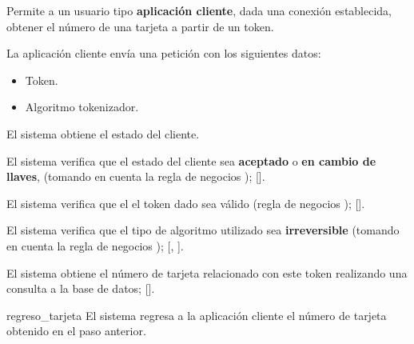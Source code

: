 %
%

{
  Permite a un usuario tipo \textbf{aplicación cliente}, dada una conexión
  establecida, obtener el número de una tarjeta a partir de un token.

  \begin{trayectoriaPrincipal}

    \item La aplicación cliente envía una petición con los siguientes datos:
      \begin{itemize}
        \item Token.
        \item Algoritmo tokenizador.
      \end{itemize}

    \item El sistema obtiene el estado del cliente.

    \item El sistema verifica que el estado del cliente sea \textbf{aceptado}
      o \textbf{en cambio de llaves}, (tomando en cuenta la regla de negocios
      );
      [].

    \item El sistema verifica que el el token dado sea válido (regla de
      negocios );
      [].

    \item El sistema verifica que el tipo de algoritmo utilizado sea
      \textbf{irreversible} (tomando en cuenta la regla de negocios
      );
      [,
      ].

    \item El sistema obtiene el número de tarjeta relacionado con este token
      realizando una consulta a la base de datos;
      [].

    \item [regreso_tarjeta] El sistema regresa a la aplicación cliente el número
      de tarjeta obtenido en el paso anterior.

  \end{trayectoriaPrincipal}

}
